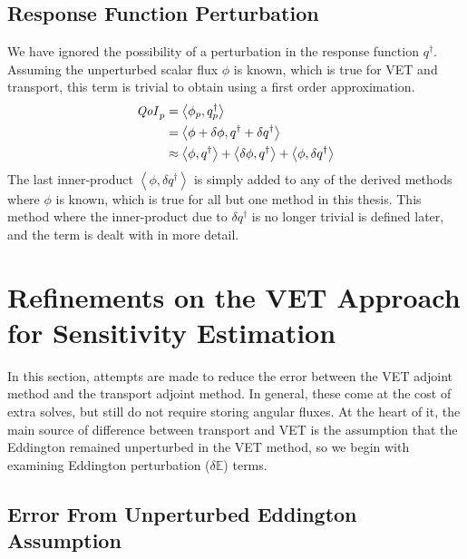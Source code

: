 \documentclass[12pt]{report}
\newcommand{\bra}{\left\langle}
\newcommand{\ket}{\right\rangle}
\newcommand{\Edd}{\mathbb{E}}
\newcommand{\scalResp}{q^\dag}
\newcommand{\qoi}{{\it QoI}\xspace}
\begin{document}
\subsection{Response Function Perturbation}
We have ignored the possibility of a perturbation in the response function $\scalResp$. Assuming the unperturbed scalar flux $\phi$ is known, which is true for VET and transport, this term is trivial to obtain using a first order approximation.
\begin{equation}
\begin{split}
\qoi_p 
&= \bra \phi_p , \scalResp_p \ket \\ 
&= \bra \phi + \delta \phi , \scalResp + \delta \scalResp \ket \\ 
&\approx \bra \phi , \scalResp \ket + \bra \delta \phi , \scalResp \ket + \bra \phi , \delta \scalResp \ket \\ 
\end{split}
\end{equation}
The last inner-product $\bra \phi , \delta \scalResp \ket$ is simply added to any of the derived methods where $\phi$ is known, which is true for all but one method in this thesis. This method where the inner-product due to $\delta \scalResp$ is no longer trivial is defined later, and the term is dealt with in more detail.

\section{Refinements on the VET Approach for Sensitivity Estimation}

In this section, attempts are made to reduce the error between the VET adjoint method and the transport adjoint method. In general, these come at the cost of extra solves, but still do not require storing angular fluxes. At the heart of it, the main source of difference between transport and VET is the assumption that the Eddington remained unperturbed in the VET method, so we begin with examining Eddington perturbation ($\delta \Edd$) terms. 
\subsection{Error From Unperturbed Eddington Assumption}
\end{document}
